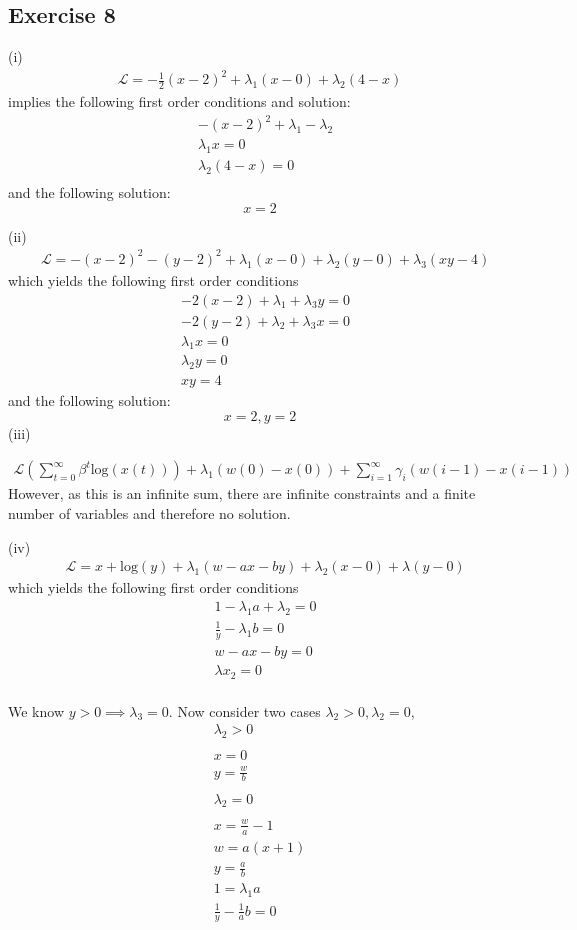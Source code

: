 \documentclass[letterpaper,12pt]{article}
\theoremstyle{definition}
\begin{document}
\subsection*{Exercise 8}
(i) 
\begin{align*}
    \mathscr{L} = -\frac{1}{2}(x-2)^2 + \lambda_1(x-0) + \lambda_2 (4-x)
\end{align*}
implies the following first order conditions and solution:
\begin{align*}
    &-(x-2)^2 + \lambda_1 - \lambda_2 \\
    &\lambda_1 x  = 0\\
    &\lambda_2 (4-x)  = 0\\
\end{align*}
and the following solution:
\[x=2\]

(ii) 
\begin{align*}
    &\mathscr{L} = -(x-2)^2 -(y-2)^2+ \lambda_1(x-0) + \lambda_2 (y-0) + \lambda_3(xy - 4)
\end{align*}
which yields the following first order conditions
\begin{align*}
    &-2(x-2) + \lambda_1 + \lambda_3y = 0\\
    &-2(y-2) + \lambda_2 + \lambda_3x = 0\\
    &\lambda_1 x = 0\\
    &\lambda_2 y = 0\\
    &xy = 4
\end{align*}
and the following solution:
\[x=2, y=2\]
(iii)

\begin{align*}
    \mathscr{L} (\sum^{\infty}_{t=0} \beta^t \text{log} (x(t))) + \lambda_1(w(0) - x(0)) + \sum^{\infty}_{i=1} \gamma_i(w(i-1) - x(i-1))
\end{align*}
However, as this is an infinite sum, there are infinite constraints and a finite number of variables and therefore no solution.

(iv)
\begin{align*}
    &\mathscr{L} = x + \text{log} (y) + \lambda_1 (w - ax - by) + \lambda_2 (x-0) + \lambda(y-0)
\end{align*}
which yields the following first order conditions
\begin{align*}
    &1 - \lambda_1a + \lambda_2 = 0\\
    &\frac{1}{y} - \lambda_1b = 0\\
    &w-ax-by = 0\\
    &\lambda x_2 = 0\\
\end{align*}


We know $y>0 \implies \lambda_3 = 0$. Now consider two cases $\lambda_2 > 0, \lambda_2 = 0$,
\begin{align*}
&\lambda_2 > 0\\
\\
&x=0\\
&y = \frac{w}{b}\\
\\
&\lambda_2 = 0\\
\\
&x = \frac{w}{a}-1\\
&w = a(x+1)\\
&y = \frac{a}{b}\\
&1 = \lambda_1 a\\
&\frac{1}{y}- \frac{1}{a}b = 0
&\end{align*}
\end{document}
